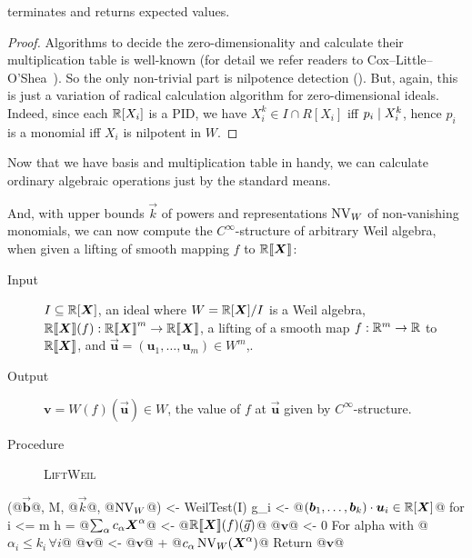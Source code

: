 \documentclass[%
  sigconf,authorversion,screen]{acmart}
\begin{document}
\begin{theorem}
   terminates and returns expected values.
\end{theorem}
\begin{proof}
  Algorithms to decide the zero-dimensionality and calculate their multiplication table is well-known (for detail we refer readers to Cox--Little--O'Shea~\cite[Chapter 2]{CLO:2005}).
  So the only non-trivial part is nilpotence detection ().
  But, again, this is just a variation of radical calculation algorithm for zero-dimensional ideals.
  Indeed, since each $\mathbb{R}[X_i]$ is a PID, we have $X_i^k \in I \cap R[X_i]$ iff $p_i \mathrel{\mid} X_i^k$, hence $p_i$ is a monomial iff $X_i$ is nilpotent in $W$.
\end{proof}
Now that we have basis and multiplication table in handy, we can calculate ordinary algebraic operations just by the standard means.

And, with upper bounds $\vec k$ of powers and representations $\operatorname{NV}_W$ of non-vanishing monomials, we can now compute the $C^\infty$-structure of arbitrary Weil algebra, when given a lifting of smooth mapping $f$ to $\mathord{\mathbb{R}\llbracket\boldsymbol{X}\rrbracket}$:

\begin{algorithm}\label{alg:smooth-weil}
  \hfill\vspace{-.25em}
  \begin{description}
    \item[Input]
      $I \subseteq \mathbb{R}[\boldsymbol{X}]$, an ideal where $W = \mathbb{R}[\boldsymbol{X}]/I$ is a Weil algebra,
      $\mathbb{R} \llbracket\boldsymbol{X}\rrbracket(f): \mathord{\mathbb{R}\llbracket\boldsymbol{X}\rrbracket}^m \to \mathord{\mathbb{R}\llbracket\boldsymbol{X}\rrbracket}$, a lifting of a smooth map $f: \mathbb{R}^m \to \mathbb{R}$ to $\mathord{\mathbb{R}\llbracket\boldsymbol{X}\rrbracket}$, and $\vec{\boldsymbol{u}} = (\boldsymbol{u}_1, \dots, \boldsymbol{u}_m) \in W^m$,.
    \item[Output] $\boldsymbol{v} = W(f)(\vec{\boldsymbol u}) \in W$, the value of $f$ at $\vec{\boldsymbol{u}}$ given by $C^\infty$-structure.
    \item[Procedure] \textup{\textsc{LiftWeil}}
  \end{description}
\begin{alg}
(@$\vec{\boldsymbol{b}}$@, M, @$\vec{k}$@, @$\operatorname{NV}_W$@) <- WeilTest(I)
g_i <- @$(\boldsymbol{b}_1, \dots, \boldsymbol{b}_k) \cdot \boldsymbol{u}_i \in \mathbb{R}[\boldsymbol{X}]$@ for i <= m
h = @$\sum_\alpha c_\alpha \boldsymbol{X}^\alpha$@ <- @$\mathord{\mathbb{R}\llbracket\boldsymbol{X}\rrbracket}(f)(\vec{g})$@
@$\boldsymbol v$@ <- 0
For alpha with @$\alpha_i \leq k_i\, \forall i$@
  @$\boldsymbol{v}$@ <- @$\boldsymbol v$@ + @$c_\alpha \operatorname{NV}_W(\boldsymbol{X}^\alpha)$@
Return @$\boldsymbol{v}$@
\end{alg}
\end{algorithm}
\end{document}
